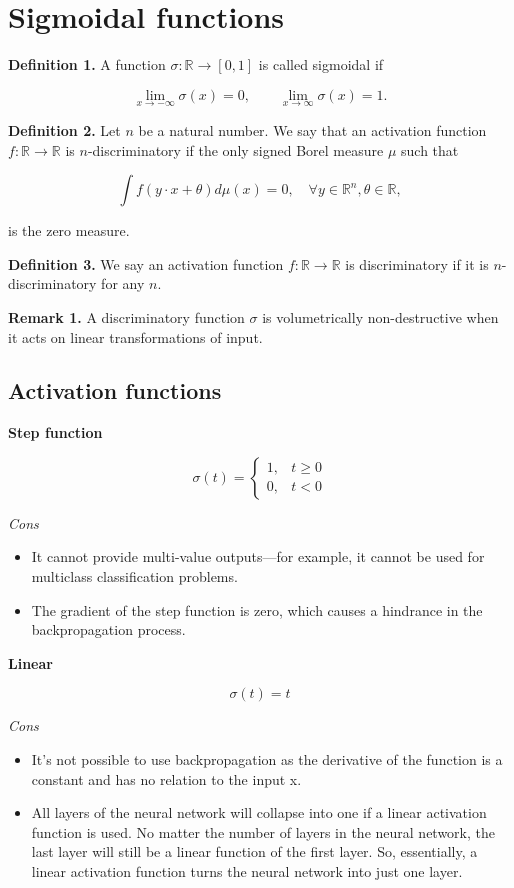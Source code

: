 \section{Sigmoidal functions}
\textbf{Definition 1.} A function $\sigma: \mathbb{R}\rightarrow [0,1]$ is called sigmoidal if

$$
\lim_{x\rightarrow -\infty}\sigma(x)=0, \qquad \lim_{x\rightarrow \infty}\sigma(x)=1.
$$

\textbf{Definition 2.} Let $n$ be a natural number. We say that an activation function $f:\mathbb{R} \rightarrow \mathbb{R}$ is $n$-discriminatory if the only signed Borel measure $\mu$ such that

$$
\int f(y\cdot x+\theta)d\mu(x)=0, \quad \forall y\in\mathbb{R}^n, \theta\in \mathbb{R},
$$

is the zero measure.

\textbf{Definition 3.} We say an activation function $f:\mathbb{R} \rightarrow \mathbb{R}$ is discriminatory if it is $n$-discriminatory for any $n$.

\textbf{Remark 1.} A discriminatory function $\sigma$ is volumetrically non-destructive when it acts on linear transformations of input.


\subsection*{Activation functions}
\textbf{Step function}

$$\sigma(t)=
\left\{
  \begin{array}{ll}
  1, & t\geq 0 \\
  0, & t<0
  \end{array}
\right.
$$

\textit{Cons}

\begin{itemize}
  \item It cannot provide multi-value outputs—for example, it cannot be used for multiclass
classification problems.
  \item The gradient of the step function is zero, which causes a hindrance in the
backpropagation process.
\end{itemize}

\textbf{Linear}

$$\sigma(t)=t$$

\textit{Cons}

\begin{itemize}
  \item It’s not possible to use backpropagation as the derivative of the function is a
constant and has no relation to the input x.
  \item All layers of the neural network will collapse into one if a linear activation
function is used. No matter the number of layers in the neural network, the last
layer will still be a linear function of the first layer. So, essentially, a linear
activation function turns the neural network into just one layer.
\end{itemize}

